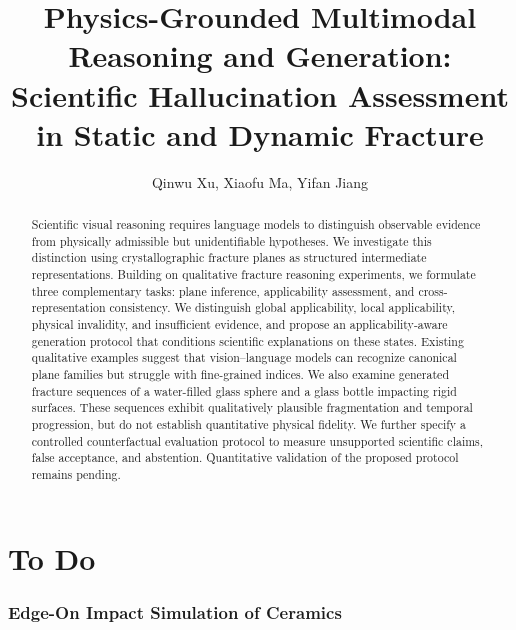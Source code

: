 \documentclass[11pt]{article}
\title{Physics-Grounded Multimodal Reasoning and Generation: Scientific Hallucination Assessment in Static and Dynamic Fracture}
\author{Qinwu Xu, Xiaofu Ma, Yifan Jiang}
\begin{document}
\maketitle
\begin{abstract}
Scientific visual reasoning requires language models to distinguish observable evidence from physically admissible but unidentifiable hypotheses. We investigate this distinction using crystallographic fracture planes as structured intermediate representations. Building on qualitative fracture reasoning experiments, we formulate three complementary tasks: plane inference, applicability assessment, and cross-representation consistency. We distinguish global applicability, local applicability, physical invalidity, and insufficient evidence, and propose an applicability-aware generation protocol that conditions scientific explanations on these states. Existing qualitative examples suggest that vision--language models can recognize canonical plane families but struggle with fine-grained indices. We also examine generated fracture sequences of a water-filled glass sphere and a glass bottle impacting rigid surfaces. These sequences exhibit qualitatively plausible fragmentation and temporal progression, but do not establish quantitative physical fidelity. We further specify a controlled counterfactual evaluation protocol to measure unsupported scientific claims, false acceptance, and abstention. Quantitative validation of the proposed protocol remains pending.
\end{abstract}

\section{To Do}


\subsubsection{Edge-On Impact Simulation of Ceramics}\label{edge-on-impact-simulation-of-ceramics}
\end{document}
